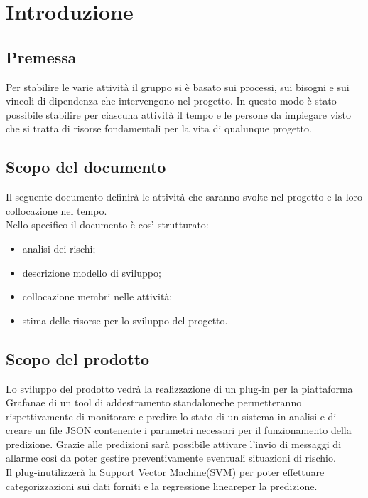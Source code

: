 \section{Introduzione}

\subsection{Premessa}
Per stabilire le varie attività il gruppo si è basato sui processi, sui bisogni e sui vincoli di dipendenza che intervengono nel progetto. In questo modo è stato possibile stabilire per ciascuna attività il tempo e le persone da impiegare visto che si tratta di risorse fondamentali per la vita di qualunque progetto.

\subsection{Scopo del documento}
Il seguente documento definirà le attività che saranno svolte nel progetto e la loro collocazione nel tempo.\\
Nello specifico il documento è così strutturato:
\begin{itemize}
\item analisi dei rischi;
\item descrizione modello di sviluppo;
\item collocazione membri nelle attività;
\item stima delle risorse per lo sviluppo del progetto.
\end{itemize}
\subsection{Scopo del prodotto}
Lo sviluppo del prodotto vedrà la realizzazione di un plug-in per la piattaforma Grafana\glo e  di un tool di addestramento standalone\glo che permetteranno rispettivamente di monitorare e predire lo stato di un sistema in analisi e di creare un file JSON contenente i parametri necessari per il funzionamento della predizione. Grazie alle predizioni sarà possibile attivare l'invio di messaggi di allarme così da poter gestire preventivamente eventuali situazioni di rischio. \\
Il plug-in\glo utilizzerà la Support Vector Machine\glo (SVM) per poter effettuare categorizzazioni sui dati forniti e la regressione lineare\glo per la predizione.
\begin{comment}
I due plug-in\glo utilizzeranno la Support Vector Machine\glo (SVM) o la Regressione Lineare per classificazione o regressione sui dati forniti.
\end{comment}

